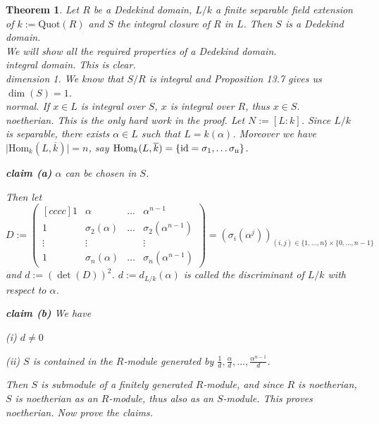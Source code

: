 \documentclass[11pt]{book}
\newtheorem{theorem}{Theorem}[section]
\theoremstyle{nonumberbreak}
\newenvironment{pr}[1][]{\ifthenelse{\equal{#1}{}}{\proof}{\proof[#1]}\rm}{\endproof}
\begin{document}
\begin{spacing}{1.3}
\begin{theorem} %
Let $R$ be a Dedekind domain, $L/k$ a finite separable field extension of $k:= \textrm{Quot}(R)$ and $S$ the integral closure of $R$ in $L$. Then $S$ is a Dedekind domain.\\
\begin{pr}
We will show all the required properties of a Dedekind domain.\\
\textit{integral domain.} This is clear.\\
\textit{dimension 1.} We know that $S/R$ is integral and Proposition 13.7 gives us $\dim(S)=1$. \\
\textit{normal.} If $x \in L$ is integral over $S$, $x$ is integral over $R$, thus $x \in S$. \\
\textit{noetherian.} This is the only hard work in the proof. 
Let $N:=[L:k]$. Since $L/k$ is separable, there exists $\alpha \in L$ such that $L=k(\alpha)$. Moreover we have $\big\vert \textrm{Hom}_{k}(L, \overline{k}) \big\vert =n$, say $\textrm{Hom}_{k}(L, \overline{k})= \{\rm{id}=\sigma_1, \ldots \sigma_n \}$.
\begin{compactenum}
\item[\textbf{claim (a)}] $\alpha$ can be chosen in $S$. 
\end{compactenum}
Then let
$$D:= \begin{pmatrix}[cccc] 1 & \alpha & \ldots & \alpha^{n-1} \\ 1 & \sigma_2(\alpha) & \ldots & \sigma_2(\alpha^{n-1}) \\ \vdots & \vdots & & \vdots \\ 1 & \sigma_n(\alpha) & \ldots & \sigma_n(\alpha^{n-1}) \end{pmatrix}=\left(\sigma_i(\alpha^j)\right)_{(i,j) \in \{1, \ldots, n \} \times \{0, \ldots, n-1 \}}$$
and $d:= \left(\det(D)\right)^2$. $d:= d_{L/k}(\alpha)$ is called the \textit{discriminant of }$L/k$\textit{ with respect to} $\alpha$. 
\begin{compactenum}
\item[\textbf{claim (b)}]We have
 \begin{compactenum}
\item[(i)] $d \neq 0$
\item[(ii)] $S$ is contained in the $R$-module generated by $\frac{1}{d}, \frac{\alpha}{d}, \ldots, \frac{\alpha^{n-1}}{d}$.
\end{compactenum}
\end{compactenum}
Then $S$ is submodule of a finitely generated $R$-module, and since $R$ is noetherian, $S$ is noetherian as an $R$-module, thus also as an $S$-module. This proves \textit{noetherian}. Now prove the claims.

\end{pr}
\end{theorem}
\end{spacing}
\end{document}
